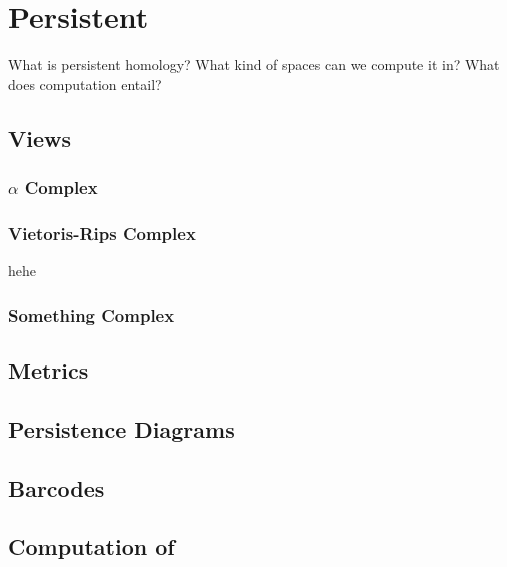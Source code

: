\chapter{Persistent}
What is persistent homology? What kind of spaces can we compute it in? What does computation entail?

\section{Views}

\subsection{$\alpha$ Complex}
\subsection{Vietoris-Rips Complex}
\begin{thm}
hehe
\end{thm}

\subsection{Something Complex}
\section{Metrics}
\section{Persistence Diagrams}
\section{Barcodes}

\section{Computation of }
